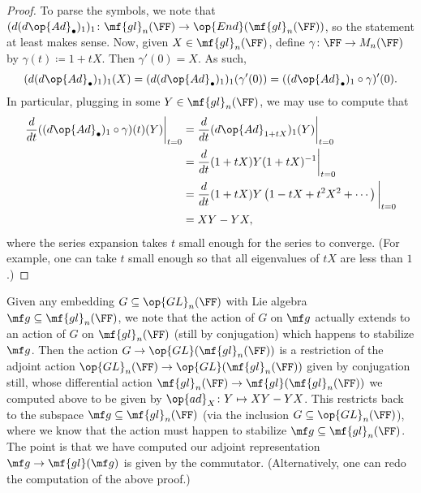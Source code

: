 \documentclass[../notes.tex]{subfiles}
\begin{document}
\begin{proof}
	To parse the symbols, we note that $(d(d{\op{Ad}_\bullet})_1)_1\colon\mf{gl}_n(\FF)\to\op{End}(\mf{gl}_n(\FF))$, so the statement at least makes sense. Now, given $X\in\mf{gl}_n(\FF)$, define $\gamma\colon\FF\to M_n(\FF)$ by $\gamma(t)\coloneqq 1+tX$. Then $\gamma'(0)=X$. As such,
	\[(d(d{\op{Ad}_\bullet})_1)_1(X)=(d(d{\op{Ad}_\bullet})_1)_1(\gamma'(0))=((d{\op{Ad}_\bullet})_1\circ\gamma)'(0).\]
	In particular, plugging in some $Y\in\mf{gl}_n(\FF)$, we may use  to compute that
	\begin{align*}
		\frac d{dt}((d{\op{Ad}_\bullet})_1\circ\gamma)(t)(Y)\bigg|_{t=0} &= \frac d{dt}(d{\op{Ad}_{1+tX}})_1(Y)\bigg|_{t=0} \\
		&= \frac d{dt}(1+tX)Y(1+tX)^{-1}\bigg|_{t=0} \\
		&= \frac d{dt}(1+tX)Y\left(1-tX+t^2X^2+\cdots\right)\bigg|_{t=0} \\
		&= XY-YX,
	\end{align*}
	where the series expansion takes $t$ small enough for the series to converge. (For example, one can take $t$ small enough so that all eigenvalues of $tX$ are less than $1$.)
\end{proof}
\begin{example}
	Given any embedding $G\subseteq\op{GL}_n(\FF)$ with Lie algebra $\mf g\subseteq\mf{gl}_n(\FF)$, we note that the action of $G$ on $\mf g$ actually extends to an action of $G$ on $\mf{gl}_n(\FF)$ (still by conjugation) which happens to stabilize $\mf g$. Then the action $G\to\op{GL}(\mf{gl}_n(\FF))$ is a restriction of the adjoint action $\op{GL}_n(\FF)\to\op{GL}(\mf{gl}_n(\FF))$ given by conjugation still, whose differential action $\mf{gl}_n(\FF)\to\mf{gl}(\mf{gl}_n(\FF))$ we computed above to be given by $\op{ad}_X\colon Y\mapsto XY-YX$. This restricts back to the subspace $\mf g\subseteq\mf{gl}_n(\FF)$ (via the inclusion $G\subseteq\op{GL}_n(\FF)$), where we know that the action must happen to stabilize $\mf g\subseteq\mf{gl}_n(\FF)$. The point is that we have computed our adjoint representation $\mf g\to\mf{gl}(\mf g)$ is given by the commutator. (Alternatively, one can redo the computation of the above proof.)
\end{example}
\end{document}
